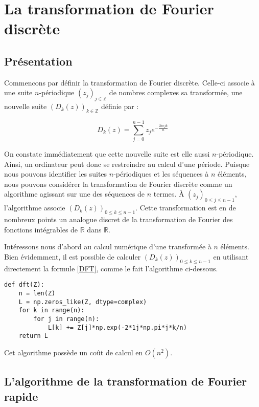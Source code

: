 \documentclass{article}
\begin{document}
\section{La transformation de Fourier discrète}

\subsection{Présentation}

Commencons par définir la transformation de Fourier discrète. Celle-ci associe à une suite $n$-périodique $(z_j)_{j\in \mathbb{Z}}$ de nombres complexes sa transformée, une nouvelle suite $(D_k(z))_{k\in\mathbb{Z}}$ définie par :

\begin{equation}
  D_k(z) = \sum_{j=0}^{n-1}z_j e^{-\frac{2i \pi j k}{n}}
  \label{DFT}
\end{equation}

On constate immédiatement que cette nouvelle suite est elle aussi $n$-périodique. Ainsi, un ordinateur peut donc se restreindre au calcul d'une période.
Puisque nous pouvons identifier les suites $n$-périodiques et les séquences à $n$ éléments, nous pouvons considérer la transformation de Fourier discrète comme un algorithme agissant sur une des séquences de $n$ termes. À $(z_j)_{0\le j \le n-1}$, l'algorithme associe 
$(D_k(z))_{0\le k \le n-1}$. Cette transformation est en de nombreux points un analogue discret de la transformation de Fourier des fonctions intégrables de $\mathbb{R}$ dans $\mathbb{R}$. 


Intéressons nous d'abord au calcul numérique d'une transformée à $n$ éléments.
Bien évidemment, il est possible de calculer $(D_k(z))_{0\le k \le n-1}$ en utilisant directement la formule \eqref{DFT}, comme le fait l'algorithme ci-dessous.

\begin{verbatim}
def dft(Z):
    n = len(Z)
    L = np.zeros_like(Z, dtype=complex)
    for k in range(n):
        for j in range(n):
            L[k] += Z[j]*np.exp(-2*1j*np.pi*j*k/n)
    return L
\end{verbatim}

Cet algorithme possède un coût de calcul en $O(n^2)$. 

\subsection{L'algorithme de la transformation de Fourier rapide} \label{sectionFFT}
\end{document}
